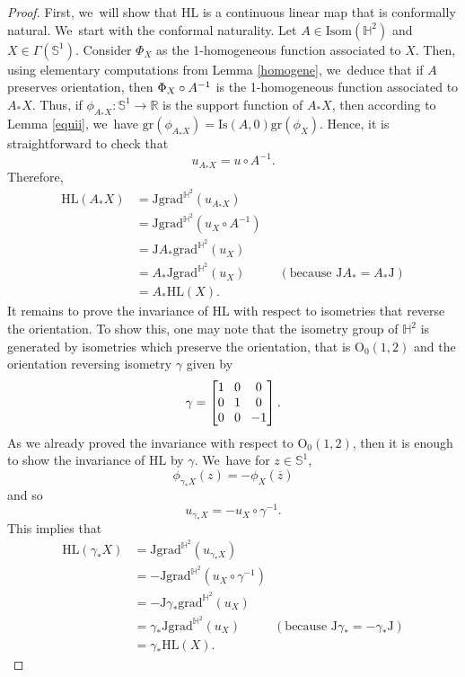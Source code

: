 \documentclass[11pt]{article}
\theoremstyle{plain}
\theoremstyle{definition}
\newcommand{\grad}{\mathrm{grad}^{\mathbb{H}^2}}
\newcommand{\J}{\mathrm{J}}
\begin{document}
\begin{proof}
First, we~will show that $\mathrm{HL}$ is a continuous linear map that is conformally natural. We~start with the conformal naturality. Let $A \in \mathrm{Isom}(\mathbb{H}^2)$ and $X \in \Gamma(\mathbb{S}^1)$. Consider $\Phi_X$ as the 1-homogeneous function associated to $X$. Then, using elementary computations from Lemma \ref{homogene}, we~deduce that if $A$ preserves orientation, then $\Phi_X \circ\nobreak A^{-1}$ is the 1-homogeneous function associated to $A_* X$. Thus, if $\phi_{A_* X}:\mathbb{S}^1 \to \mathbb{R}$ is the support function of $A_* X$, then according to Lemma \ref{equii}, we~have $\mathrm{gr}(\phi_{A_* X}) = \mathrm{Is}(A, 0) \mathrm{gr}(\phi_X)$. Hence, it is straightforward to check that
\[
u_{A_*X}=u\circ A^{-1}.
\]
Therefore,
\begin{align*}
\mathrm{HL}(A_*X)&=\J\grad(u_{A_*X})\\
&=\J\grad(u_X\circ A^{-1})\\
&=\J A_* \grad(u_X)\\
&=A_*\J\grad(u_X) \ \ \ \ \ \ \ \ \ \ \ \ (\text{because $\J A_*=A_*\J$})\\
&=A_*\mathrm{HL}(X).
\end{align*}
It remains to prove the invariance of $\mathrm{HL}$ with respect to isometries that reverse the orientation. To show this, one may note that the isometry group of $\mathbb{H}^2$ is generated by isometries which preserve the orientation, that is $\mathrm{O}_0(1,2)$ and the orientation reversing isometry $\gamma$ given by
\[\arraycolsep4pt
\gamma=\begin{bmatrix}
1 & 0 & 0 \\
0 & 1 & 0 \\
0 & 0 & -1
\end{bmatrix}.
\]
As we already proved the invariance with respect to $\mathrm{O}_0(1,2)$, then it is enough to show the invariance of $\mathrm{HL}$ by $\gamma$. We~have for $z \in \mathbb{S}^1$,
\[
\phi_{\gamma_*X}(z)=-\phi_X(\overline{z})
\]
and so
\[
u_{\gamma_*X}=-u_X\circ\gamma^{-1}.
\]
This implies that \begin{align*}
\mathrm{HL}(\gamma_*X)&=\J\grad(u_{\gamma_*X})\\
&=-\J\grad(u_X\circ \gamma^{-1})\\
&=-\J \gamma_* \grad(u_X)\\
&=\gamma_*\J\grad(u_X) \ \ \ \ \ \ \ \ \ \ \ \ (\text{because $\J \gamma_*=-\gamma_*\J$})\\
&=\gamma_*\mathrm{HL}(X).
\end{align*}

\end{proof}
\end{document}
